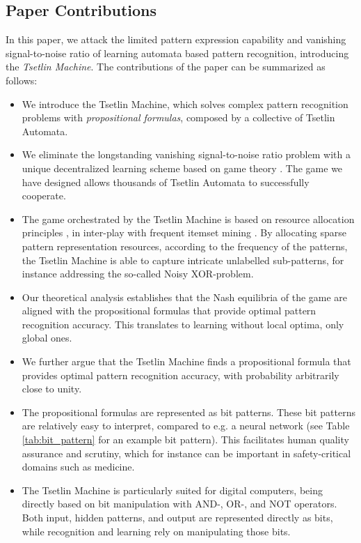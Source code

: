 \documentclass[11pt,a4paper]{article}
\begin{document}
\subsection{Paper Contributions}
In this paper, we attack the limited pattern expression capability and vanishing signal-to-noise ratio of learning automata based pattern recognition, introducing the \emph{Tsetlin Machine}. The contributions of the paper can be summarized as follows:
\begin{itemize}
\item We introduce the Tsetlin Machine, which  solves complex pattern recognition problems with \emph{propositional formulas}, composed by a collective of Tsetlin Automata.
\item We eliminate the longstanding vanishing signal-to-noise ratio problem with a unique decentralized learning scheme based on game theory \cite{VonNeumann1947,Tsetlin1961}. The game we have designed allows thousands of Tsetlin Automata to successfully cooperate.
\item The game orchestrated by the Tsetlin Machine is based on resource allocation principles \cite{Granmo2007a}, in inter-play with frequent itemset mining  \cite{Haugland2014}. By allocating sparse pattern representation resources, according to the frequency of the patterns, the Tsetlin Machine is able to capture intricate unlabelled sub-patterns, for instance addressing the so-called Noisy XOR-problem.
\item Our theoretical analysis establishes that the Nash equilibria of the game are aligned with the propositional formulas that provide optimal pattern recognition accuracy. This translates to learning without local optima, only global ones.
\item We further argue that the Tsetlin Machine finds a propositional formula that provides optimal pattern recognition accuracy, with probability arbitrarily close to unity.
\item The propositional formulas are represented as bit patterns. These bit patterns are relatively easy to interpret, compared to e.g. a neural network (see Table \ref{tab:bit_pattern} for an example bit pattern). This facilitates human quality assurance and scrutiny, which for instance can be important in safety-critical domains such as medicine.
\item The Tsetlin Machine is particularly suited for digital computers, being directly based on bit manipulation with AND-, OR-, and NOT operators. Both input, hidden patterns, and output are represented directly as bits, while recognition and learning rely on manipulating those bits.

\end{itemize}
\end{document}

